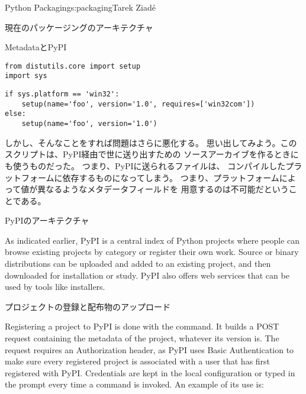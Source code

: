 \begin{aosachapter}{Python Packaging}{s:packaging}{Tarek Ziad\'{e}}
\begin{aosasect1}{現在のパッケージングのアーキテクチャ}
\begin{aosasect2}{MetadataとPyPI}
\begin{verbatim}
from distutils.core import setup
import sys
\end{verbatim}
\begin{verbatim}
if sys.platform == 'win32':
    setup(name='foo', version='1.0', requires=['win32com'])
else:
    setup(name='foo', version='1.0')
\end{verbatim}

\noindent
しかし、そんなことをすれば問題はさらに悪化する。
思い出してみよう。このスクリプトは、PyPI経由で世に送り出すための
ソースアーカイブを作るときにも使うものだった。
つまり、PyPIに送られるファイルは、
コンパイルしたプラットフォームに依存するものになってしまう。
つまり、プラットフォームによって値が異なるようなメタデータフィールドを
用意するのは不可能だということである。

\end{aosasect2}

\begin{aosasect2}{PyPIのアーキテクチャ}


As indicated earlier, PyPI is a central index of Python projects where
people can browse existing projects by category or register their own
work.  Source or binary distributions can be uploaded and added to an
existing project, and then downloaded for installation or study.  PyPI
also offers web services that can be used by tools like installers.

\begin{aosasect3}{プロジェクトの登録と配布物のアップロード}

Registering a project to PyPI is done with the 
 command.  It builds a POST request containing the
metadata of the project, whatever its version is.  The request
requires an Authorization header, as PyPI uses Basic Authentication to
make sure every registered project is associated with a user that has
first registered with PyPI\@.  Credentials are kept in the local
 configuration or typed in the prompt every time a
 command is invoked.  An example of its use is:


\end{aosasect3}
\end{aosasect2}
\end{aosasect1}
\end{aosachapter}
